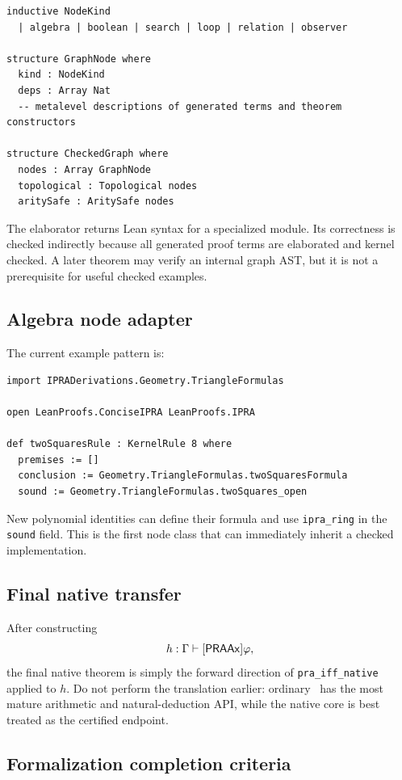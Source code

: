 \begin{lstlisting}
inductive NodeKind
  | algebra | boolean | search | loop | relation | observer

structure GraphNode where
  kind : NodeKind
  deps : Array Nat
  -- metalevel descriptions of generated terms and theorem constructors

structure CheckedGraph where
  nodes : Array GraphNode
  topological : Topological nodes
  aritySafe : AritySafe nodes
\end{lstlisting}
The elaborator returns Lean syntax for a specialized module.  Its correctness is checked indirectly because all generated proof terms are elaborated and kernel checked.  A later theorem may verify an internal graph AST, but it is not a prerequisite for useful checked examples.

\subsection{Algebra node adapter}

The current example pattern is:

\begin{lstlisting}
import IPRADerivations.Geometry.TriangleFormulas

open LeanProofs.ConciseIPRA LeanProofs.IPRA

def twoSquaresRule : KernelRule 8 where
  premises := []
  conclusion := Geometry.TriangleFormulas.twoSquaresFormula
  sound := Geometry.TriangleFormulas.twoSquares_open
\end{lstlisting}
New polynomial identities can define their formula and use \texttt{ipra\_ring} in the \texttt{sound} field.  This is the first node class that can immediately inherit a checked implementation.

\subsection{Final native transfer}

After constructing
\[
 h:\Gamma\vdash[\mathsf{PRAAx}]\varphi,
\]
the final native theorem is simply the forward direction of \texttt{pra\_iff\_native} applied to \(h\).  Do not perform the translation earlier: ordinary \iPRA\ has the most mature arithmetic and natural-deduction API, while the native core is best treated as the certified endpoint.

\subsection{Formalization completion criteria}

